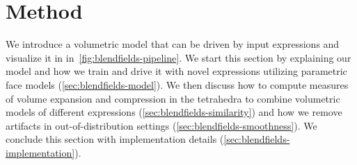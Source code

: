 
\section{Method}
  \label{sec:blendifleds-method}

  We introduce a volumetric model that can be driven by input expressions and
  visualize it in in~\cref{fig:blendfields-pipeline}.
  We start this section by explaining our model and how we train and drive it
  with novel expressions utilizing parametric face models
  (\cref{sec:blendfields-model}).
  We then discuss how to compute measures of volume expansion and compression
  in the tetrahedra to combine volumetric models of different expressions
  (\cref{sec:blendfields-similarity}) and how we remove artifacts in
  out-of-distribution settings (\cref{sec:blendfields-smoothness}).
  We conclude this section with implementation details
  (\cref{sec:blendfields-implementation}).


